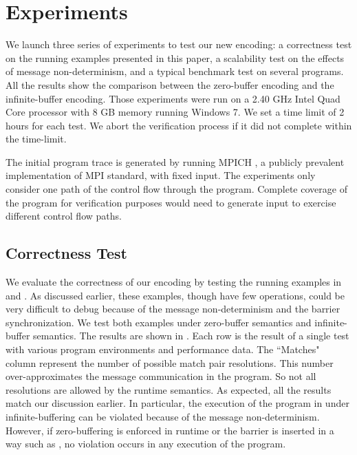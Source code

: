 \section{Experiments}
We launch three series of experiments to test our new encoding: a correctness test on the running examples presented in this paper, a scalability test on the effects of message non-determinism, and a typical benchmark test on several programs. All the results show the comparison between the zero-buffer encoding and the infinite-buffer encoding.  Those experiments were run on a 2.40 GHz Intel Quad Core processor with 8 GB memory running Windows 7. We set a time limit of 2 hours for each test. We abort the verification process if it did not complete within the time-limit. 

The initial program trace is generated by running MPICH \cite{mpich}, a publicly prevalent implementation of MPI standard, with fixed input. The experiments only consider one path of the control flow through the program. Complete coverage of the program for verification purposes would need to generate input to exercise different control flow paths. 

\subsection{Correctness Test}
We evaluate the correctness of our encoding by testing the running examples in  and . As discussed earlier, these examples, though have few operations, could be very difficult to debug because of the message non-determinism and the barrier synchronization. We test both examples under zero-buffer semantics and infinite-buffer semantics. The results are shown in . Each row is the result of a single test with various program environments and performance data. The ``Matches" column represent the number of possible match pair resolutions.  This number over-approximates the message communication in the program. So not all resolutions are allowed by the runtime semantics. As expected, all the results match our discussion earlier. In particular, the execution of the program in  under infinite-buffering can be violated because of the message non-determinism. However, if zero-buffering is enforced in runtime or the barrier is inserted in a way such as , no violation occurs in any execution of the program. 

